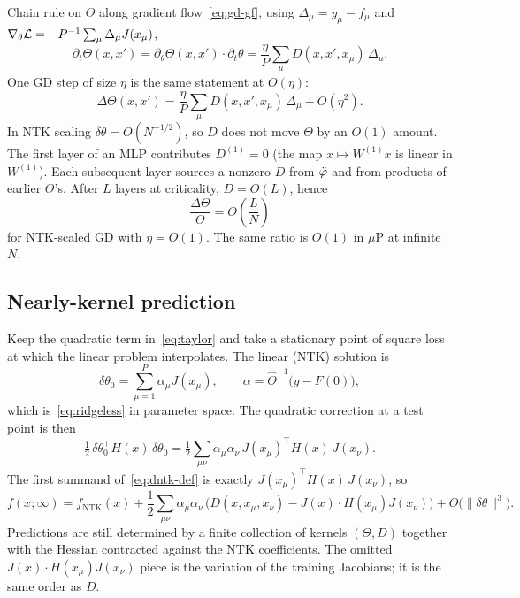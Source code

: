 Chain rule on $\Theta$ along gradient flow~\eqref{eq:gd-gf}, using $\Delta_\mu=y_\mu-f_\mu$ and $\nabla_\theta\mathcal{L}=-P^{-1}\sum_\mu\Delta_\mu J(x_\mu)$,
\begin{equation}
  \partial_t\Theta(x,x')
  =\partial_\theta\Theta(x,x')\cdot\partial_t\theta
  =\frac{\eta}{P}\sum_{\mu} D(x,x',x_\mu)\,\Delta_\mu.
  \label{eq:dtheta-cont}
\end{equation}
One GD step of size $\eta$ is the same statement at $O(\eta)$:
\begin{equation}
  \Delta\Theta(x,x')
  =\frac{\eta}{P}\sum_{\mu} D(x,x',x_\mu)\,\Delta_\mu
  +O(\eta^2).
  \label{eq:dtheta}
\end{equation}
In NTK scaling $\delta\theta=O(N^{-1/2})$, so $D$ does not move $\Theta$ by an $O(1)$ amount. The first layer of an MLP contributes $D^{(1)}=0$ (the map $x\mapsto W^{(1)}x$ is linear in $W^{(1)}$). Each subsequent layer sources a nonzero $D$ from $\ddot{\varphi}$ and from products of earlier $\Theta$'s. After $L$ layers at criticality, $D=O(L)$, hence
\begin{equation}
  \frac{\Delta\Theta}{\Theta}
  =O\!\left(\frac{L}{N}\right)
  \label{eq:dtheta-LN}
\end{equation}
for NTK-scaled GD with $\eta=O(1)$. The same ratio is $O(1)$ in $\mu$P at infinite $N$.

\subsection{Nearly-kernel prediction}

Keep the quadratic term in~\eqref{eq:taylor} and take a stationary point of square loss at which the linear problem interpolates. The linear (NTK) solution is
\begin{equation}
  \delta\theta_0
  =\sum_{\mu=1}^{P}\alpha_\mu J(x_\mu),
  \qquad
  \alpha=\hat\Theta^{-1}\bigl(y-F(0)\bigr),
  \label{eq:dtheta-lin}
\end{equation}
which is~\eqref{eq:ridgeless} in parameter space. The quadratic correction at a test point is then
\begin{equation}
  \tfrac12\,\delta\theta_0^\top H(x)\,\delta\theta_0
  =\tfrac12\sum_{\mu\nu}\alpha_\mu\alpha_\nu\, J(x_\mu)^\top H(x)\,J(x_\nu).
  \label{eq:quad-corr}
\end{equation}
The first summand of~\eqref{eq:dntk-def} is exactly $J(x_\mu)^\top H(x)\,J(x_\nu)$, so
\begin{equation}
  f(x;\infty)
  =f_{\mathrm{NTK}}(x)
  +\frac12\sum_{\mu\nu}\alpha_\mu\alpha_\nu\,
  \bigl(D(x,x_\mu,x_\nu)-J(x)\cdot H(x_\mu)J(x_\nu)\bigr)
  +O\bigl(\|\delta\theta\|^3\bigr).
  \label{eq:nearly-kernel}
\end{equation}
Predictions are still determined by a finite collection of kernels $(\Theta,D)$ together with the Hessian contracted against the NTK coefficients. The omitted $J(x)\cdot H(x_\mu)J(x_\nu)$ piece is the variation of the training Jacobians; it is the same order as $D$.

